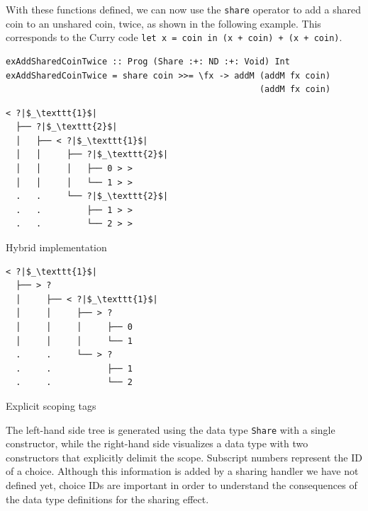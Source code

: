 \documentclass[a4paper, 11pt, fleqn, twoside]{scrreprt}
\newcommand{\hinl}[1]{\texttt{#1}}
\begin{document}
With these functions defined, we can now use the \hinl{share} operator to add a shared coin to an unshared coin, twice, as shown in the following example.
This corresponds to the Curry code \hinl{let x = coin in (x + coin) + (x + coin)}.

\begin{verbatim}
exAddSharedCoinTwice :: Prog (Share :+: ND :+: Void) Int
exAddSharedCoinTwice = share coin >>= \fx -> addM (addM fx coin) 
                                                  (addM fx coin)
\end{verbatim}

\vspace{0.32cm}

\begin{minipage}{.4 \linewidth}
\begin{verbatim}
< ?|$_\texttt{1}$|
  ├── ?|$_\texttt{2}$|
  │   ├── < ?|$_\texttt{1}$|
  │   │     ├── ?|$_\texttt{2}$|
  │   │     │   ├── 0 > >
  │   │     │   └── 1 > >
  .   .     └── ?|$_\texttt{2}$|
  .   .         ├── 1 > >
  .   .         └── 2 > >
\end{verbatim}
\begin{center}
Hybrid implementation
\end{center}
\end{minipage}
\hspace{.1 \linewidth}
\vline
\hspace{.1 \linewidth}
\begin{minipage}{.475 \linewidth}
\begin{verbatim}
< ?|$_\texttt{1}$|
  ├── > ? 
  │     ├── < ?|$_\texttt{1}$|
  │     │     ├── > ? 
  │     │     │     ├── 0
  │     │     │     └── 1
  .     .     └── > ? 
  .     .           ├── 1
  .     .           └── 2
\end{verbatim}
\begin{center}
Explicit scoping tags
\end{center}
\end{minipage}

\vspace{0.32cm}

The left-hand side tree is generated using the data type \hinl{Share} with a single constructor, while the right-hand side visualizes a data type with two constructors that explicitly delimit the scope.
Subscript numbers represent the ID of a choice.
Although this information is added by a sharing handler we have not defined yet, choice IDs are important in order to understand the consequences of the data type definitions for the sharing effect.
\end{document}
